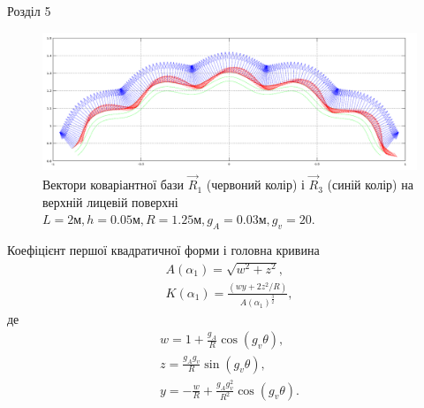 \documentclass[8pt]{beamer}
\numberwithin{figure}{section}
\numberwithin{equation}{section}
\numberwithin{table}{section}
\begin{document}
\begin{frame}{Розділ 5}
\begin{figure}
	\includegraphics[scale=0.2]{pic/cor_R1R32.png}
		\caption{Вектори коваріантної бази $\vec{R}_1$ (червоний колір) і $\vec{R}_3$ (синій колір) на верхній лицевій поверхні $L=2\text{м}, h=0.05\text{м},R=1.25\text{м},g_A=0.03\text{м}, g_v=20$.}
\end{figure}

Коефіцієнт першої квадратичної форми і головна кривина
\begin{gather}
A\left(\alpha_1\right) = \sqrt{w^2+z^2},\\
K\left(\alpha_1\right) = \frac{\left(wy+2z^2/R\right)}{A\left(\alpha_1\right)^{\frac{3}{2}}},
\end{gather}
де
\begin{gather*}
w=1+\frac{g_A}{R}\cos\left(g_v\theta\right),\\
z=\frac{g_A g_v}{R}\sin\left(g_v\theta\right),\\
y=-\frac{w}{R}+\frac{g_A g_v^2}{R^2}\cos\left(g_v\theta\right).
\end{gather*}


\end{frame}
\end{document}

